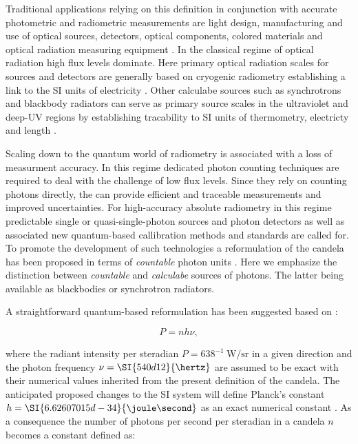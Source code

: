 		Traditional applications relying on this definition in conjunction with accurate photometric and radiometric measurements are light design, manufacturing and use of optical sources, detectors, optical components, colored materials and optical radiation measuring equipment \cite{zwinckels::paper}. In the classical regime of optical radiation high flux levels dominate. Here primary optical radiation scales for sources and detectors are generally based on cryogenic radiometry establishing a link to the SI units of electricity \cite{Cheung2007::5}. Other calculabe sources such as synchrotrons and blackbody radiators can serve as primary source scales in the ultraviolet and deep-UV regions by establishing tracability to SI units of thermometry, electricty and length \cite{zwinckels::paper, Cheung2007}.

		Scaling down to the quantum world of radiometry is associated with a loss of measurment accuracy. In this regime dedicated photon counting techniques are required to deal with the challenge of low flux levels. Since they rely on counting photons directly, the can provide efficient and traceable measurements and improved uncertainties. For high-accuracy absolute radiometry in this regime predictable single or quasi-single-photon sources and photon detectors as well as associated new quantum-based callibration methods and standards are called for. To promote the development of such technologies a reformulation of the candela has been proposed in terms of \emph{countable} photon units \cite{zwinckels::paper, Cheung2007, Milton, Martin (14 November 2016). Highlights in the work of the BIPM in 2016, www.quantumcandela.org}. Here we emphasize the distinction between \emph{countable} and \emph{calculabe} sources of photons. The latter being available as blackbodies or synchrotron radiators.

		A straightforward quantum-based reformulation has been suggested based on \cite{Cheung2007, zwinckels::paper}:

		\begin{equation}
			P = n h \nu,
		\end{equation}

		where the radiant intensity per steradian $P = 638^{-1} \SI{}{\watt\per\steradian}$ in a given direction and the photon frequency $\nu = \SI{540d12}{\hertz}$ are assumed to be exact with their numerical values inherited from the present definition of the candela. The anticipated proposed changes to the SI system will define Planck's constant $h = \SI{6.62607015d-34}{\joule\second}$ as an exact numerical constant \cite{porposal}. As a consequence the number of photons per second per steradian in a candela $n$ becomes a constant defined as:

